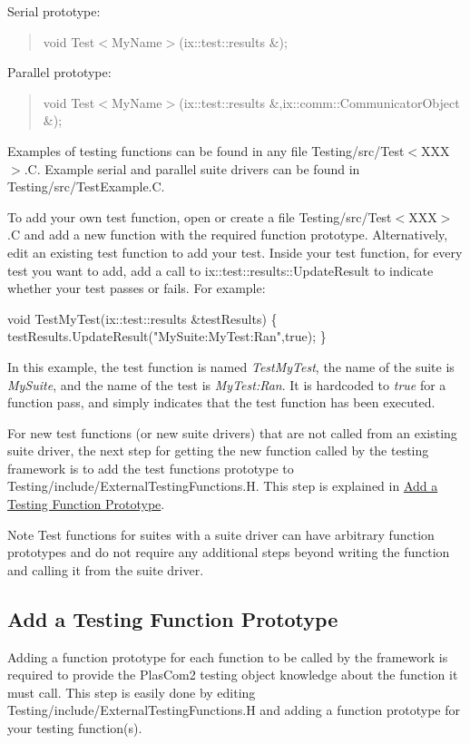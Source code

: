 Serial prototype\+: \begin{quote}
void Test$<$\+My\+Name$>$(ix\+::test\+::results \&); \end{quote}


Parallel prototype\+: \begin{quote}
void Test$<$\+My\+Name$>$(ix\+::test\+::results \&,ix\+::comm\+::\+Communicator\+Object \&); \end{quote}


Examples of testing functions can be found in any file Testing/src/\+Test$<$\+X\+X\+X$>$.C. Example serial and parallel suite drivers can be found in Testing/src/\+Test\+Example.\+C.

To add your own test function, open or create a file Testing/src/\+Test$<$\+X\+X\+X$>$.C and add a new function with the required function prototype. Alternatively, edit an existing test function to add your test. Inside your test function, for every test you want to add, add a call to ix\+::test\+::results\+::\+Update\+Result to indicate whether your test passes or fails. For example\+:


\begin{DoxyCode}
\textcolor{keywordtype}{void} TestMyTest(ix::test::results &testResults)
\{
   testResults.UpdateResult(\textcolor{stringliteral}{"MySuite:MyTest:Ran"},\textcolor{keyword}{true});
\}
\end{DoxyCode}


In this example, the test function is named {\itshape Test\+My\+Test}, the name of the suite is {\itshape My\+Suite}, and the name of the test is {\itshape My\+Test\+:Ran}. It is hardcoded to {\itshape true} for a function pass, and simply indicates that the test function has been executed.

For new test functions (or new suite drivers) that are not called from an existing suite driver, the next step for getting the new function called by the testing framework is to add the test function\textquotesingle{}s prototype to Testing/include/\+External\+Testing\+Functions.\+H. This step is explained in \hyperlink{testing_reference_addproto}{Add a Testing Function Prototype}.

\begin{DoxyNote}{Note}
Test functions for suites with a suite driver can have arbitrary function prototypes and do not require any additional steps beyond writing the function and calling it from the suite driver.
\end{DoxyNote}
\hypertarget{testing_reference_addproto}{}\subsection{Add a Testing Function Prototype}\label{testing_reference_addproto}
Adding a function prototype for each function to be called by the framework is required to provide the Plas\+Com2 testing object knowledge about the function it must call. This step is easily done by editing Testing/include/\+External\+Testing\+Functions.\+H and adding a function prototype for your testing function(s).

